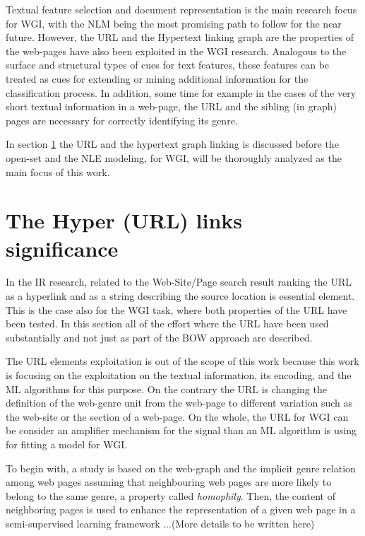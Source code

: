 Textual feature selection and document representation is the main research focus for WGI, with the NLM being the most promising path to follow for the near future. However, the URL and the Hypertext linking graph are the properties of the web-pages have also been exploited in the WGI research.  Analogous to the surface and structural types of cues for text features, these features can be treated as cues for extending or mining additional information for the classification process. In addition, some time for example in the cases of the very short textual information in a web-page, the URL and the sibling (in graph) pages are necessary for correctly identifying its genre. 

In section \ref{chap:relevant_work:sec:url} the URL and the hypertext graph linking is discussed before the open-set and the NLE modeling, for WGI, will be thoroughly analyzed as the main focus of this work.

\section{The Hyper (URL) links significance}\label{chap:relevant_work:sec:url}

In the IR research, related to the Web-Site/Page search result ranking the URL as a hyperlink and as a string describing the source location is essential element. This is the case also for the WGI task, where both properties of the URL have been tested. In this section all of the effort where the URL have been used substantially and not just as part of the BOW approach are described. 

The URL elements exploitation is out of the scope of this work because this work is focusing on the exploitation on the textual information, its encoding, and the ML algorithms for this purpose. On the contrary the URL is changing the definition of the web-genre unit from the web-page to different variation such as the web-site or the section of a web-page. On the whole, the URL for WGI can be consider an amplifier mechanism for the signal than an ML algorithm is using for fitting a model for WGI.

To begin with, a study is based on the web-graph and the implicit genre relation among web pages assuming that neighbouring web pages are more likely to belong to the same genre, a property called \textit{homophily}. Then, the content of neighboring pages is used to enhance the representation of a given web page in a semi-supervised learning framework \parencite{asheghi2014semi}...(More details to be written here)

